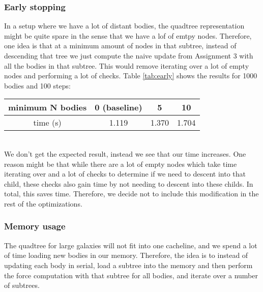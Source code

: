 \documentclass[a4paper]{scrartcl}
\begin{document}
        \subsubsection{Early stopping}
            In a setup where we have a lot of distant bodies, the quadtree
            representation might be quite spare in the sense that we have a lof
            of emtpy nodes. Therefore, one idea is that at a minimum amount of
            nodes in that subtree, instead of descending that tree we just
            compute the naive update from Assignment 3 with all the bodies in
            that subtree. This would remove iterating over a lot of empty nodes
            and performing a lot of checks. Table \ref{tab:early} shows the
            results for 1000 bodies and 100 steps:\\[10pt] 
            \noindent\begin{tabular}{c|c|c|c}\label{tab:early}
                minimum N bodies & 0 (baseline) & 5 & 10 \\
                \hline
                time (s) & 1.119 & 1.370 & 1.704\\
            \end{tabular}\\

            We don't get the expected result, instead we see that our time
            increases. One reason might be that while there are a lot of empty
            nodes which take time iterating over and a lot of checks to
            determine if we need to descent into that child, these checks also
            gain time by not needing to descent into these childs. In total,
            this saves time. Therefore, we decide not to include this
            modification in the rest of the optimizations.
            

        \subsubsection{Memory usage}
            The quadtree for large galaxies will not fit into one cacheline, and
            we spend a lot of time loading new bodies in our memory. Therefore,
            the idea is to instead of updating each body in serial, load a
            subtree into the memory and then perform the force computation with
            that subtree for all bodies, and iterate over a number of subtrees.
\end{document}
